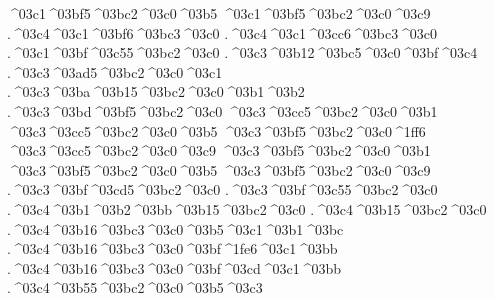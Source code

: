 {^^^^03c1^^^^03bf5^^^^03bc2^^^^03c0^^^^03b5
^^^^03c1^^^^03bf5^^^^03bc2^^^^03c0^^^^03c9
  .^^^^03c4^^^^03c1^^^^03bf6^^^^03bc3^^^^03c0	 %
  .^^^^03c4^^^^03c1^^^^03cc6^^^^03bc3^^^^03c0      %
.^^^^03c1^^^^03bf^^^^03c55^^^^03bc2^^^^03c0     %
.^^^^03c3^^^^03b12^^^^03bc5^^^^03c0^^^^03bf^^^^03c4    %
.^^^^03c3^^^^03ad5^^^^03bc2^^^^03c0^^^^03c1    %
.^^^^03c3^^^^03ba^^^^03b15^^^^03bc2^^^^03c0^^^^03b1^^^^03b2   %
.^^^^03c3^^^^03bd^^^^03bf5^^^^03bc2^^^^03c0     %
^^^^03c3^^^^03cc5^^^^03bc2^^^^03c0^^^^03b1     %
^^^^03c3^^^^03cc5^^^^03bc2^^^^03c0^^^^03b5
^^^^03c3^^^^03bf5^^^^03bc2^^^^03c0^^^^1ff6
^^^^03c3^^^^03cc5^^^^03bc2^^^^03c0^^^^03c9
^^^^03c3^^^^03bf5^^^^03bc2^^^^03c0^^^^03b1
^^^^03c3^^^^03bf5^^^^03bc2^^^^03c0^^^^03b5
^^^^03c3^^^^03bf5^^^^03bc2^^^^03c0^^^^03c9
.^^^^03c3^^^^03bf^^^^03cd5^^^^03bc2^^^^03c0    %
.^^^^03c3^^^^03bf^^^^03c55^^^^03bc2^^^^03c0
.^^^^03c4^^^^03b1^^^^03b2^^^^03bb^^^^03b15^^^^03bc2^^^^03c0   %
.^^^^03c4^^^^03b15^^^^03bc2^^^^03c0      %
  .^^^^03c4^^^^03b16^^^^03bc3^^^^03c0^^^^03b5^^^^03c1^^^^03b1^^^^03bc  %
  .^^^^03c4^^^^03b16^^^^03bc3^^^^03c0^^^^03bf^^^^1fe6^^^^03c1^^^^03bb %
  .^^^^03c4^^^^03b16^^^^03bc3^^^^03c0^^^^03bf^^^^03cd^^^^03c1^^^^03bb
.^^^^03c4^^^^03b55^^^^03bc2^^^^03c0^^^^03b5^^^^03c3    %
}

